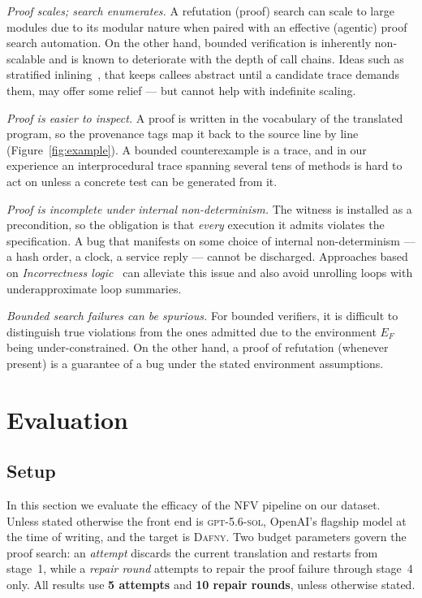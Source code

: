 \documentclass[11pt,letterpaper]{article}
\newcommand{\daf}{\textsc{Dafny}}
\begin{document}
\emph{Proof scales; search enumerates.} 
A refutation (proof) search can scale to large modules due to its modular nature when paired with an
effective (agentic) proof search automation. 
On the other hand, bounded verification is inherently non-scalable and is known to deteriorate with the depth of call chains.
Ideas such as stratified inlining~\cite{lal2012corral}, that keeps callees abstract
until a candidate trace demands them, may offer some relief --- but cannot help with indefinite scaling.

\emph{Proof is easier to inspect.} A proof is written in the vocabulary of the
translated program, so the provenance tags map it back to the source line by
line (Figure~\ref{fig:example}). A bounded counterexample is a trace, and in our
experience an interprocedural trace spanning several tens of methods is hard to 
act on unless a concrete test can be generated from it.

\emph{Proof is incomplete under internal non-determinism.} The witness is
installed as a precondition, so the obligation is that \emph{every} execution it
admits violates the specification. A bug that manifests on some choice of internal non-determinism 
--- a hash order, a clock, a service reply --- cannot be
discharged. Approaches based on \emph{Incorrectness logic}~\cite{ohearn2020incorrectness}
can alleviate this issue and also avoid unrolling loops with underapproximate loop summaries. 

\emph{Bounded search failures can be spurious.} For bounded verifiers, it is difficult to 
distinguish true violations from the ones admitted due to the environment $E_F$ being under-constrained.
On the other hand, a proof of refutation (whenever present) is a guarantee of a bug under the 
stated environment assumptions. 

\section{Evaluation}
\label{sec:eval}

\subsection{Setup}
\label{sec:knobs}

In this section we evaluate the efficacy of the NFV pipeline on our dataset. 
Unless stated otherwise the front end is \textsc{gpt-5.6-sol}, OpenAI's flagship
model at the time of writing, and the target is \daf{}.
Two budget parameters govern the proof search: an \emph{attempt} discards the current
translation and restarts from stage~1, while a \emph{repair round} attempts to repair
the proof failure through stage~4 only. 
All results use \textbf{5 attempts} and \textbf{10 repair rounds}, unless otherwise stated.
\end{document}
